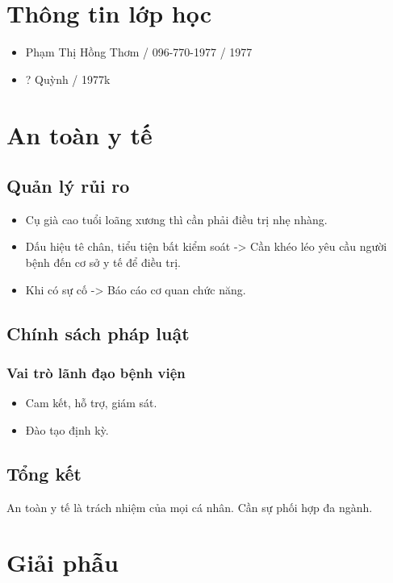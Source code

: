 
\section{Thông tin lớp học}
\begin{itemize}
    \item Phạm Thị Hồng Thơm / 096-770-1977 / 1977
    \item ? Quỳnh / 1977k
\end{itemize}

\newpage


\section{An toàn y tế}

\subsection{Quản lý rủi ro}

\begin{itemize}
    \item Cụ già cao tuổi loãng xương thì cần phải điều trị nhẹ nhàng.
    \item Dấu hiệu tê chân, tiểu tiện bất kiểm soát -> Cần khéo léo yêu cầu người bệnh đến cơ sở y tế để điều trị.
    \item Khi có sự cố -> Báo cáo cơ quan chức năng.
\end{itemize}

\subsection{Chính sách pháp luật}

\subsubsection{Vai trò lãnh đạo bệnh viện}
\begin{itemize}
    \item Cam kết, hỗ trợ, giám sát.
    \item Đào tạo định kỳ.
\end{itemize}

\subsection{Tổng kết}
An toàn y tế là trách nhiệm của mọi cá nhân. Cần sự phối hợp đa ngành.

\section{Giải phẫu}
